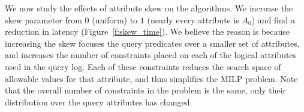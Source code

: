  We now study the effects of attribute skew on the algorithms.
We increase the skew parameter from $0$ (uniform) to $1$ (nearly every attribute is $A_0$) 
and find a reduction in latency (Figure~\ref{f:skew_time}).
We believe the reason is because increasing the skew focuses the query predicates over a smaller set of attributes, 
and increases the number of constraints placed on each of the logical attributes used in the query log.  
Each of these constraints reduces the search space of allowable values for that attribute, and thus simplifies the MILP problem.
Note that the overall number of constraints in the problem is the same, only their distribution over the query attributes has changed.


% 
% 
% 


